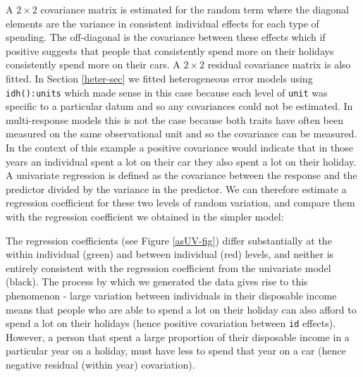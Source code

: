 \documentclass{article}
\begin{document}
A $2\times2$ covariance matrix is estimated for the random term where the diagonal elements are the variance in consistent individual effects for each type of spending. The off-diagonal is the covariance between these effects which if positive suggests that people that consistently spend more on their holidays consistently spend more on their cars. A $2\times2$ residual covariance matrix is also fitted. In Section \ref{heter-sec}  we fitted heterogeneous error models using \texttt{idh():units} which made sense in this case because each level of \texttt{unit} was specific to a particular datum and so any covariances could not be estimated.   In multi-response models this is not the case because both traits have often been measured on the same observational unit and so the covariance can be measured. In the context of this example a positive covariance would indicate that in those years an individual spent a lot on their car they also spent a lot on their holiday.\\

A univariate regression is defined as the covariance between the response and the predictor divided by the variance in the predictor. We can therefore estimate a regression coefficient for these two levels of random variation, and compare them with the regression coefficient we obtained in the simpler model:
 
\begin{Schunk}
\end{Schunk}

The regression coefficients (see Figure \ref{asUV-fig}) differ substantially at the within individual (green) and between individual (red) levels, and neither is entirely consistent with the regression coefficient from the univariate model (black). The process by which we generated the data gives rise to this phenomenon - large variation between individuals in their disposable income means that people who are able to spend a lot on their holiday can also afford to spend a lot on their holidays (hence positive covariation between \texttt{id} effects). However, a person that spent a large proportion of their disposable income in a particular year on a holiday, must have less to spend that year on a car (hence negative residual (within year) covariation). \\    
\end{document}
